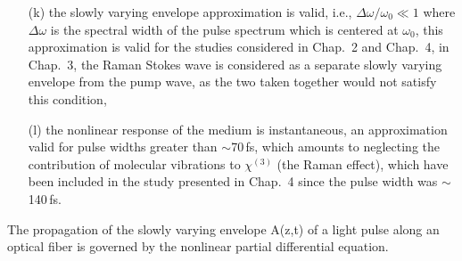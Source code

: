 \begin{enumerate}
\item[(k)] the slowly varying envelope approximation is valid, i.e.,
$\Delta\omega/\omega_{0} \ll 1$ where $\Delta \omega$ is the spectral
width of the pulse spectrum which is centered at $\omega_{0}$, this approximation is valid for the studies considered in Chap.\ 2 and Chap.\ 4, in Chap.\ 3, the Raman Stokes wave is considered as a separate slowly varying envelope from the pump wave, as the two taken together would not satisfy this condition,
\item[(l)] the nonlinear response of the medium is instantaneous, an
approximation valid for pulse widths greater than $\sim$70\,fs, which amounts to neglecting the contribution of molecular vibrations to $\chi^{(3)}$ (the Raman effect), which have been included in the study presented in Chap.\ 4 since the pulse width was $\sim$ 140\,fs.
\end{enumerate}
The propagation of the slowly varying envelope A(z,t) of a light
pulse
along an optical fiber is governed by the nonlinear partial
differential equation.\cite{Wang2006a} %

